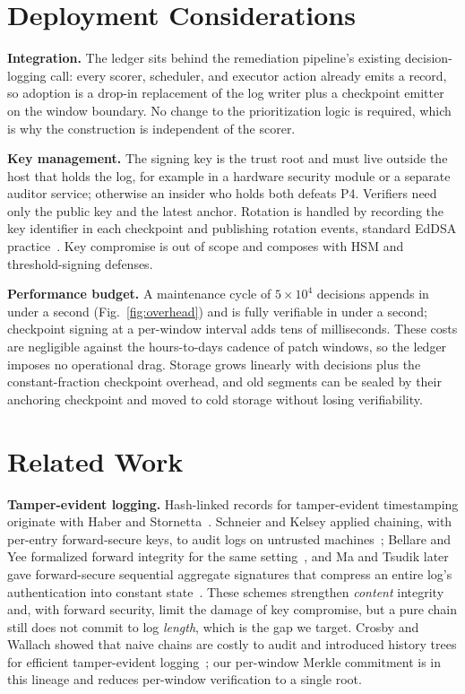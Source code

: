 \documentclass[journal]{IEEEtran}
\begin{document}
\section{Deployment Considerations}
\label{sec:deploy}
\textbf{Integration.} The ledger sits behind the remediation pipeline's
existing decision-logging call: every scorer, scheduler, and executor action
already emits a record, so adoption is a drop-in replacement of the log
writer plus a checkpoint emitter on the window boundary. No change to the
prioritization logic is required, which is why the construction is
independent of the scorer.

\textbf{Key management.} The signing key is the trust root and must live
outside the host that holds the log, for example in a hardware security
module or a separate auditor service; otherwise an insider who holds both
defeats P4. Verifiers need only the public key and the latest anchor.
Rotation is handled by recording the key identifier in each checkpoint and
publishing rotation events, standard EdDSA practice~\cite{rfc8032}. Key
compromise is out of scope and composes with HSM and threshold-signing
defenses.

\textbf{Performance budget.} A maintenance cycle of $5\times10^4$ decisions
appends in under a second (Fig.~\ref{fig:overhead}) and is fully verifiable
in under a second; checkpoint signing at a per-window interval adds tens of
milliseconds. These costs are negligible against the hours-to-days cadence of
patch windows, so the ledger imposes no operational drag. Storage grows
linearly with decisions plus the constant-fraction checkpoint overhead, and
old segments can be sealed by their anchoring checkpoint and moved to cold
storage without losing verifiability.

\section{Related Work}
\label{sec:related}
\textbf{Tamper-evident logging.} Hash-linked records for tamper-evident
timestamping originate with Haber and
Stornetta~\cite{haber1991timestamp}. Schneier and Kelsey applied chaining,
with per-entry forward-secure keys, to audit logs on untrusted
machines~\cite{schneier1999secure}; Bellare and Yee formalized forward
integrity for the same setting~\cite{bellare1997forward}, and Ma and Tsudik
later gave forward-secure sequential aggregate signatures that compress an
entire log's authentication into constant state~\cite{ma2009secure}. These
schemes strengthen \emph{content} integrity and, with forward security, limit
the damage of key compromise, but a pure chain still does not commit to log
\emph{length}, which is the gap we target. Crosby and Wallach showed that
naive chains are costly to audit and introduced history trees for efficient
tamper-evident logging~\cite{crosby2009tamper}; our per-window Merkle
commitment is in this lineage and reduces per-window verification to a single
root.
\end{document}
